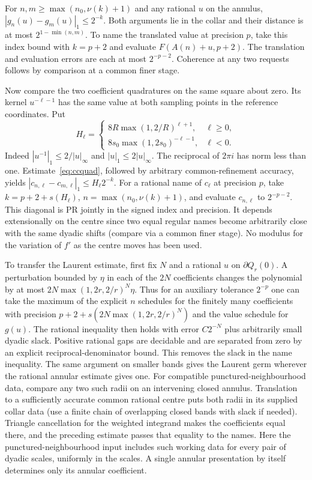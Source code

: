 For $n,m\ge\max(n_0,\nu(k)+1)$ and any rational $u$ on the annulus,
$|g_n(u)-g_m(u)|_1\le2^{-k}$. Both arguments lie in the collar and their distance is at most $2^{1-\min(n,m)}$. To name the translated value at precision $p$, take this index bound with $k=p+2$ and evaluate $F(A(n)+u,p+2)$. The translation and evaluation errors are each at most $2^{-p-2}$. Coherence at any two requests follows by comparison at a common finer stage.

Now compare the two coefficient quadratures on the same square about zero. Its kernel $u^{-\ell-1}$ has the same value at both sampling points in the reference coordinates. Put
\[
 H_\ell=
 \begin{cases}
  8R\max(1,2/R)^{\ell+1}, & \ell\ge0,\\
  8s_0\max(1,2s_0)^{-\ell-1},&\ell<0.
 \end{cases}
\]
Indeed $|u^{-1}|_1\le 2/|u|_\infty$ and $|u|_1\le2|u|_\infty$. The reciprocal of $2\pi i$ has norm less than one. Estimate~\eqref{eq:ccquad}, followed by arbitrary common-refinement accuracy, yields
$|c_{n,\ell}-c_{m,\ell}|_1\le H_\ell 2^{-k}$.
For a rational name of $c_\ell$ at precision $p$, take
$k=p+2+s(H_\ell)$,
$n=\max(n_0,\nu(k)+1)$, and evaluate $c_{n,\ell}$ to $2^{-p-2}$. This diagonal is PR jointly in the signed index and precision. It depends extensionally on the centre since two equal regular names become arbitrarily close with the same dyadic shifts (compare via a common finer stage). No modulus for the variation of $f'$ as the centre moves has been used.

To transfer the Laurent estimate, first fix $N$ and a rational $u$ on $\partial Q_r(0)$. A perturbation bounded by $\eta$ in each of the $2N$ coefficients changes the polynomial by at most $2N\max(1,2r,2/r)^N\eta$. Thus for an auxiliary tolerance $2^{-p}$ one can take the maximum of the explicit $n$ schedules for the finitely many coefficients with precision $p+2+s(2N\max(1,2r,2/r)^N)$ and the value schedule for $g(u)$. The rational inequality then holds with error $C2^{-N}$ plus arbitrarily small dyadic slack. Positive rational gaps are decidable and are separated from zero by an explicit reciprocal-denominator bound. This removes the slack in the name inequality. The same argument on smaller bands gives the Laurent germ wherever the rational annular estimate gives one. For compatible punctured-neighbourhood data, compare any two such radii on an intervening closed annulus. Translation to a sufficiently accurate common rational centre puts both radii in its supplied collar data (use a finite chain of overlapping closed bands with slack if needed). Triangle cancellation for the weighted integrand makes the coefficients equal there, and the preceding estimate passes that equality to the names. Here the punctured-neighbourhood input includes such working data for every pair of dyadic scales, uniformly in the scales. A single annular presentation by itself determines only its annular coefficient.

